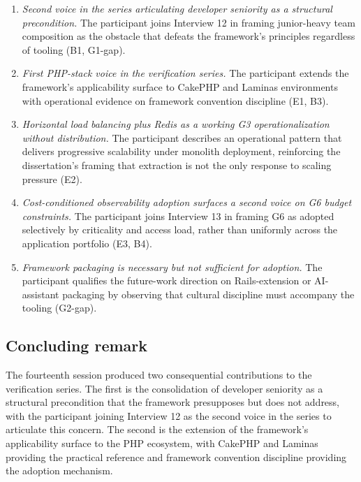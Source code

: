 \begin{enumerate}[itemsep=4pt,topsep=2pt]
  \item \emph{Second voice in the series articulating developer seniority as a structural precondition.} The participant joins Interview 12 in framing junior-heavy team composition as the obstacle that defeats the framework's principles regardless of tooling (B1, G1-gap).
  \item \emph{First PHP-stack voice in the verification series.} The participant extends the framework's applicability surface to CakePHP and Laminas environments with operational evidence on framework convention discipline (E1, B3).
  \item \emph{Horizontal load balancing plus Redis as a working G3 operationalization without distribution.} The participant describes an operational pattern that delivers progressive scalability under monolith deployment, reinforcing the dissertation's framing that extraction is not the only response to scaling pressure (E2).
  \item \emph{Cost-conditioned observability adoption surfaces a second voice on G6 budget constraints.} The participant joins Interview 13 in framing G6 as adopted selectively by criticality and access load, rather than uniformly across the application portfolio (E3, B4).
  \item \emph{Framework packaging is necessary but not sufficient for adoption.} The participant qualifies the future-work direction on Rails-extension or AI-assistant packaging by observing that cultural discipline must accompany the tooling (G2-gap).
\end{enumerate}

\subsection*{Concluding remark}

The fourteenth session produced two consequential contributions to the verification series. The first is the consolidation of developer seniority as a structural precondition that the framework presupposes but does not address, with the participant joining Interview 12 as the second voice in the series to articulate this concern. The second is the extension of the framework's applicability surface to the PHP ecosystem, with CakePHP and Laminas providing the practical reference and framework convention discipline providing the adoption mechanism.
